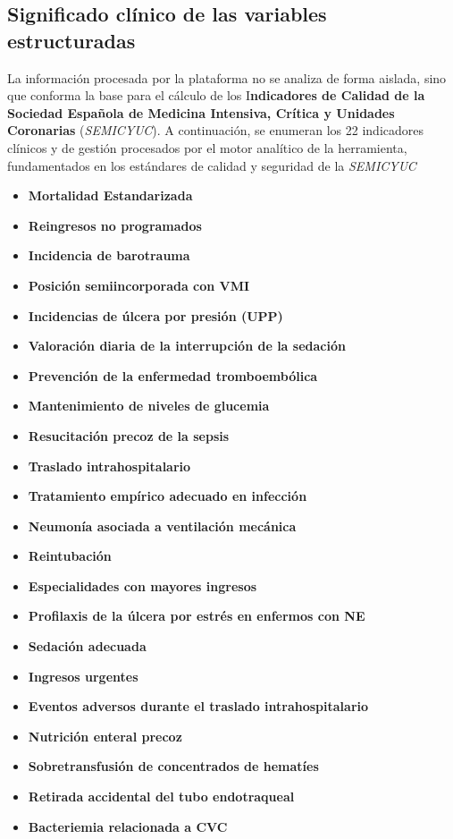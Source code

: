 \subsection{Significado clínico de las variables estructuradas}

La información procesada por la plataforma no se analiza de forma aislada, sino que conforma la base para el cálculo de los I\textbf{ndicadores de Calidad de la Sociedad Española de Medicina Intensiva, Crítica y Unidades Coronarias} (\textit{SEMICYUC}). A continuación, se enumeran los 22 indicadores clínicos y de gestión procesados por el motor analítico de la herramienta, fundamentados en los estándares de calidad y seguridad de la \textit{SEMICYUC} \cite{semicyuc}

\begin{itemize}
    \item \textbf{Mortalidad Estandarizada}
    \item \textbf{Reingresos no programados}
    \item \textbf{Incidencia de barotrauma}
    \item \textbf{Posición semiincorporada con VMI}
    \item \textbf{Incidencias de úlcera por presión (UPP)}
    \item \textbf{Valoración diaria de la interrupción de la sedación}
    \item \textbf{Prevención de la enfermedad tromboembólica}
    \item \textbf{Mantenimiento de niveles de glucemia}
    \item \textbf{Resucitación precoz de la sepsis}
    \item \textbf{Traslado intrahospitalario}
    \item \textbf{Tratamiento empírico adecuado en infección}
    \item \textbf{Neumonía asociada a ventilación mecánica}
    \item \textbf{Reintubación}
    \item \textbf{Especialidades con mayores ingresos}
    \item \textbf{Profilaxis de la úlcera por estrés en enfermos con NE}
    \item \textbf{Sedación adecuada}
    \item \textbf{Ingresos urgentes}
    \item \textbf{Eventos adversos durante el traslado intrahospitalario}
    \item \textbf{Nutrición enteral precoz}
    \item \textbf{Sobretransfusión de concentrados de hematíes}
    \item \textbf{Retirada accidental del tubo endotraqueal}
    \item \textbf{Bacteriemia relacionada a CVC}
\end{itemize}
 
